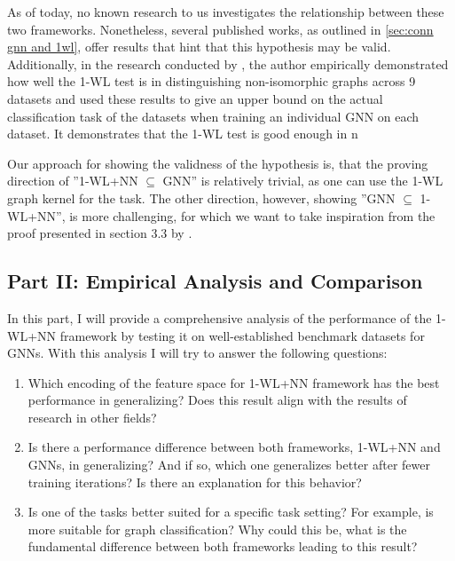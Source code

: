 \documentclass[11pt, dvipsnames, DIV=12]{scrreprt}
\theoremstyle{definition}
\begin{document}
As of today, no known research to us investigates the relationship between these two frameworks. Nonetheless, several published works, as outlined in \ref{sec:conn gnn and 1wl}, offer results that hint that this hypothesis may be valid.  Additionally, in the research conducted by \cite{Zopf2022}, the author empirically demonstrated how well the 1-WL test is in distinguishing non-isomorphic graphs across 9 datasets and used these results to give an upper bound on the actual classification task of the datasets when training an individual GNN on each dataset. It demonstrates that the 1-WL test is good enough in n

Our approach for showing the validness of the hypothesis is, that the proving direction of ''1-WL+NN $\subseteq$ GNN'' is relatively trivial, as one can use the 1-WL graph kernel for the task. The other direction, however, showing ''GNN $\subseteq$ 1-WL+NN'', is more challenging, for which we want to take inspiration from the proof presented in section 3.3 by \cite{Xu2018}.

\subsection{Part II: Empirical Analysis and Comparison}
In this part, I will provide a comprehensive analysis of the performance of the 1-WL+NN framework by testing it on well-established benchmark datasets for GNNs. With this analysis I will try to answer the following questions:
\begin{enumerate}[label=Q\arabic*)]
    \item Which encoding of the feature space for 1-WL+NN framework has the best performance in generalizing? Does this result align with the results of research in other fields?
    \item Is there a performance difference between both frameworks, 1-WL+NN and GNNs, in generalizing? And if so, which one generalizes better after fewer training iterations? Is there an explanation for this behavior?
    \item Is one of the tasks better suited for a specific task setting? For example, is more suitable for graph classification? Why could this be, what is the fundamental difference between both frameworks leading to this result?
\end{enumerate}
\end{document}
